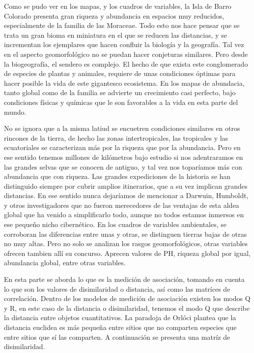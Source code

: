 \documentclass[11pt,]{article}
\begin{document}
Como se pudo ver en los mapas, y los cuadros de variables, la Isla de
Barro Colorado presenta gran riqueza y abundancia en espacios muy
reducidos, especialmente de la familia de las Moraceae. Todo esto nos
hace pensar que se trata un gran bioma en miniatura en el que se reducen
las distancias, y se incrementan los ejemplares que hacen confluir la
biología y la geografía. Tal vez en el aspecto geomorfológico no se
puedan hacer conjeturas similares. Pero desde la biogeografía, el
sendero es complejo. El hecho de que exista este conglomerado de
especies de plantas y animales, requiere de unas condiciones óptimas
para hacer posible la vida de este gigantesco ecosistema. En los mapas
de abundacia, tanto global como de la familia se advierte un crecimiento
casi perfecto, bajo condiciones físicas y químicas que le son favorables
a la vida en esta parte del mundo.

No se ignora que a la misma latiud se encuetren condiciones similares en
otros rincones de la tierra, de hecho las zonas intertropicales, las
tropicales y las ecuatoriales se caracterizan más por la riqueza que por
la abundancia. Pero en ese sentido tenemos millones de kilómetros bajo
estudio si nos adentraramos en las grandes selvas que se conocen de
antiguo, y tal vez nos toparíamos más con abundancia que con riqueza.
Las grandes expediciones de la historia se han distinguido siempre por
cubrir amplios itinerarios, que a su vez implican grandes distancias. En
ese sentido nunca dejaríamos de mencionar a Darwuin, Humboldt, y otros
investigadores que no fueron merecedores de las ventajas de esta aldea
global que ha venido a simplificarlo todo, aunque no todos estamos
inmersos en ese pequeño nicho cibernético. En los cuadros de variables
ambientales, se corroboran las diferencias entre unas y otras, se
distinguen tierras bajas de otras no muy altas. Pero no solo se analizan
los rasgos geomorfológicos, otras variables ofrecen tambien allí su
concurso. Aprecen valores de PH, riqueza global por igual, abundancia
global, entre otras variables.

En esta parte se aborda lo que es la medición de asociación, tomando en
cuenta lo que son los valores de disimilaridad o distancia, así como las
matríces de correlación. Dentro de los modelos de medición de asociación
existen los modos Q y R, en este caso de la distancia o disimilaridad,
tenemos el modo Q que describe la distancia entre objetos cuantitativos.
La paradoja de Orlóci plantea que la distancia euclidea es más pequeña
entre sitios que no comparten especies que entre sitios que sí las
comparten. A continuación se presenta una matríz de disimilaridad.
\end{document}
